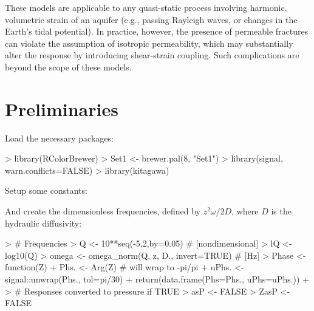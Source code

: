 \documentclass[12pt]{article}
\begin{document}
 These models are applicable to any quasi-static process involving harmonic, 
 volumetric strain of an aquifer 
 (e.g., passing Rayleigh waves, or changes in the Earth's tidal potential). 
 In practice, however, the presence of permeable fractures can violate the
 assumption of isotropic permeability, which may substantially
 alter the response by introducing shear-strain coupling. Such
 complications are beyond the scope of these models.

\section{Preliminaries}


Load the necessary packages:

\begin{Schunk}
\begin{Sinput}
> library(RColorBrewer)
> Set1 <- brewer.pal(8, "Set1")
> library(signal, warn.conflicts=FALSE)
> library(kitagawa)
\end{Sinput}
\end{Schunk}

Setup some constants:

\begin{Schunk}
\end{Schunk}

And create the dimensionless frequencies, 
defined by $z^2 \omega / 2 D$,
where $D$ is the hydraulic diffusivity:

\begin{Schunk}
\begin{Sinput}
> # Frequencies
> Q <- 10**seq(-5,2,by=0.05)					# [nondimensional]
> lQ <- log10(Q)
> omega <- omega_norm(Q, z, D., invert=TRUE)		# [Hz]
> Phase <- function(Z){
+ 	Phs. <- Arg(Z) # will wrap to -pi/pi
+ 	uPhs. <- signal::unwrap(Phs., tol=pi/30)
+ 	return(data.frame(Phs=Phs., uPhs=uPhs.))
+ }
> # Responses converted to pressure if TRUE
> asP <- FALSE
> ZasP <- FALSE
\end{Sinput}
\end{Schunk}
\end{document}
